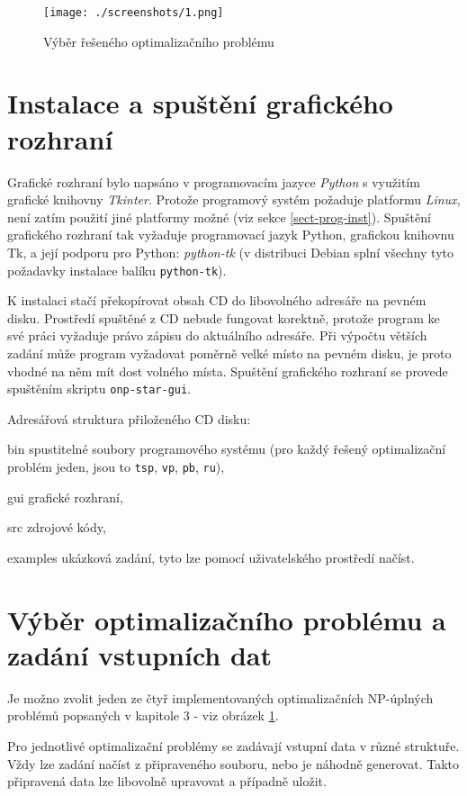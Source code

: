 \documentclass[12pt,notitlepage,fleqn]{report} %
\theoremstyle{definition}
\newcommand{\code}[1]{\texttt{#1}}
\begin{document}
\begin{figure}[h]
 \centering
 \texttt{[image: ./screenshots/1.png]}
 \caption{Výběr řešeného optimalizačního problému}
 \label{fig:gui-1}
\end{figure}

\section{Instalace a spuštění grafického rozhraní}
Grafické rozhraní bylo napsáno v programovacím jazyce \emph{Python} s využitím grafické knihovny \emph{Tkinter}. Protože programový systém požaduje platformu \emph{Linux}, není zatím použití jiné platformy možné (viz sekce \ref{sect-prog-inst}). Spuštění grafického rozhraní tak vyžaduje programovací jazyk Python, grafickou knihovnu Tk, a její podporu pro Python: \emph{python-tk} (v distribuci Debian splní všechny tyto požadavky instalace balíku \code{python-tk}).

K instalaci stačí překopírovat obsah CD do libovolného adresáře na pevném disku. Prostředí spuštěné z CD nebude fungovat korektně, protože program ke své práci vyžaduje právo zápisu do aktuálního adresáře. Při výpočtu větších zadání může program vyžadovat poměrně velké místo na pevném disku, je proto vhodné na něm mít dost volného místa. Spuštění grafického rozhraní se provede spuštěním skriptu \code{onp-star-gui}.

Adresářová struktura přiloženého CD disku:
\begin{compactdesc}
\item[bin] spustitelné soubory programového systému (pro každý řešený optimalizační problém jeden, jsou to \code{tsp}, \code{vp}, \code{pb}, \code{ru}),
\item[gui] grafické rozhraní,
\item[src] zdrojové kódy,
\item[examples] ukázková zadání, tyto lze pomocí uživatelského prostředí načíst.
\end{compactdesc}

\section{Výběr optimalizačního problému a zadání vstupních dat}

Je možno zvolit jeden ze čtyř implementovaných optimalizačních NP-úplných problémů popsaných v kapitole 3 - viz obrázek \ref{fig:gui-1}.

Pro jednotlivé optimalizační problémy se zadávají vstupní data v různé struktuře. Vždy lze zadání načíst z připraveného souboru, nebo je náhodně generovat. Takto připravená data lze libovolně upravovat a případně uložit.
\end{document}
